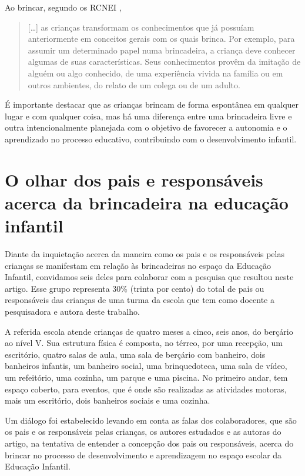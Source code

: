 \begin{refsection}
    Ao brincar, segundo os RCNEI \cite[p.~27]{RCN2001}, 

    \begin{quotation}
        [\dots] as crianças transformam os conhecimentos que já possuíam anteriormente em conceitos gerais com os quais brinca. Por exemplo, para assumir um determinado papel numa brincadeira, a criança deve conhecer algumas de suas características. Seus conhecimentos provêm da imitação de alguém ou algo conhecido, de uma experiência vivida na família ou em outros ambientes, do relato de um colega ou de um adulto. 
    \end{quotation}

    É importante destacar que as crianças brincam de forma espontânea em qualquer lugar e com qualquer coisa, mas há uma diferença entre uma brincadeira livre e outra intencionalmente planejada com o objetivo de favorecer a autonomia e o aprendizado no processo educativo, contribuindo com o desenvolvimento infantil. 


    \section{O olhar dos pais e responsáveis acerca da brincadeira na educação infantil}

    Diante da inquietação acerca da maneira como os pais e os responsáveis pelas crianças se manifestam em relação às brincadeiras no espaço da Educação Infantil, convidamos seis deles para colaborar com a pesquisa que resultou neste artigo. Esse grupo representa 30\% (trinta por cento) do total de pais ou responsáveis das crianças de uma turma da escola que tem como docente a pesquisadora e autora deste trabalho. 

    A referida escola atende crianças de quatro meses a cinco, seis anos, do berçário ao nível V. Sua estrutura física é composta, no térreo, por uma recepção, um escritório, quatro salas de aula, uma sala de berçário com banheiro, dois banheiros infantis, um banheiro social, uma brinquedoteca, uma sala de vídeo, um refeitório, uma cozinha, um parque e uma piscina. No primeiro andar, tem espaço coberto, para eventos, que é onde são realizadas as atividades motoras, mais um escritório, dois banheiros sociais e uma cozinha.  

    Um diálogo foi estabelecido levando em conta as falas dos colaboradores, que são os pais e os responsáveis pelas crianças, os autores estudados e as autoras do artigo, na tentativa de entender a concepção dos pais ou responsáveis, acerca do brincar no processo de desenvolvimento e aprendizagem no espaço escolar da Educação Infantil. 


\end{refsection}
